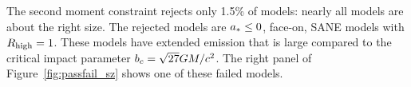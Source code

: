 
The second moment constraint rejects only 1.5\% of models: nearly all models are about the right size.  The rejected models are $a_* \le 0$, face-on, SANE models with $R_\mathrm{high} = 1$.  These models have extended emission that is large compared to the critical impact parameter $b_c = \sqrt{27} GM/c^2$.  The right panel of Figure~\ref{fig:passfail_sz} shows one of these failed models.



